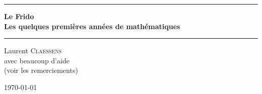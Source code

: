 

\thispagestyle{empty}
\begin{center}
	\begin{minipage}{15cm}
		\hrule\par
		\vspace{2mm}
		\begin{center}
			\Huge \bfseries Le Frido \\  {\small Les quelques premières années de mathématiques}
			\normalsize
		\end{center}
		\hrule\par
	\end{minipage}
\end{center}

\vspace{2cm}

\begin{center}
	Laurent \textsc{Claessens} \\
	\vspace{0.5cm}
	avec beaucoup d'aide \\
	(voir les remerciements)

	\vspace{1cm}

	\today\\
	\texttt{\GitCommitHexsha}


\end{center}

\vfill

\LogoEtLicence

\newpage



